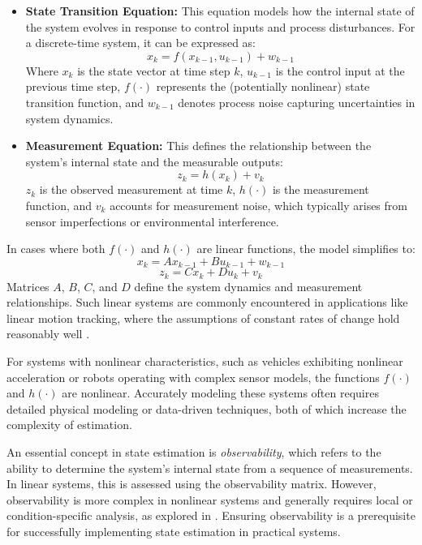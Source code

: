 \begin{itemize}
    \item \textbf{State Transition Equation:} This equation models how the internal state of the system evolves in response to control inputs and process disturbances. For a discrete-time system, it can be expressed as:
    \begin{equation}
        x_k = f(x_{k-1}, u_{k-1}) + w_{k-1}
    \end{equation}
    Where $x_k$ is the state vector at time step $k$, $u_{k-1}$ is the control input at the previous time step, $f(\cdot)$ represents the (potentially nonlinear) state transition function, and $w_{k-1}$ denotes process noise capturing uncertainties in system dynamics.

    \item \textbf{Measurement Equation:} This defines the relationship between the system’s internal state and the measurable outputs:
    \begin{equation}
        z_k = h(x_k) + v_k
    \end{equation}
    $z_k$ is the observed measurement at time $k$, $h(\cdot)$ is the measurement function, and $v_k$ accounts for measurement noise, which typically arises from sensor imperfections or environmental interference.
\end{itemize}

In cases where both $f(\cdot)$ and $h(\cdot)$ are linear functions, the model simplifies to:
\begin{equation}
    x_k = A x_{k-1} + B u_{k-1} + w_{k-1}
\end{equation}
\begin{equation}
    z_k = C x_k + D u_k + v_k
\end{equation}
Matrices $A$, $B$, $C$, and $D$ define the system dynamics and measurement relationships. Such linear systems are commonly encountered in applications like linear motion tracking, where the assumptions of constant rates of change hold reasonably well \cite{kalman}.

For systems with nonlinear characteristics, such as vehicles exhibiting nonlinear acceleration or robots operating with complex sensor models, the functions $f(\cdot)$ and $h(\cdot)$ are nonlinear. Accurately modeling these systems often requires detailed physical modeling or data-driven techniques, both of which increase the complexity of estimation.

An essential concept in state estimation is \textit{observability}, which refers to the ability to determine the system's internal state from a sequence of measurements. In linear systems, this is assessed using the observability matrix. However, observability is more complex in nonlinear systems and generally requires local or condition-specific analysis, as explored in \cite{s18010217}. Ensuring observability is a prerequisite for successfully implementing state estimation in practical systems.


